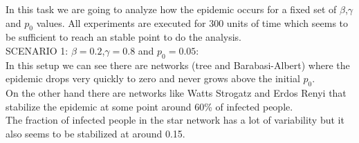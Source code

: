 \documentclass{article}
\begin{document}
\noindent In this task we are going to analyze how the epidemic occurs for a fixed set of $\beta$,$\gamma$ and $p_{0}$ values. All experiments are executed for 300 units of time which seems to be sufficient to reach an stable point to do the analysis.\\

\noindent SCENARIO 1: $\beta = 0.2$,$\gamma = 0.8$ and $p_{0} = 0.05$: \\

\noindent In this setup we can see there are networks (tree and Barabasi-Albert) where the epidemic drops very quickly to zero and never grows above the initial $p_{0}$.\\

\noindent On the other hand there are networks like Watts Strogatz and Erdos Renyi that stabilize the epidemic at some point around 60\% of infected people.\\

\noindent The fraction of infected people in the star network has a lot of variability but it also seems to be stabilized at around 0.15.\\
\end{document}
